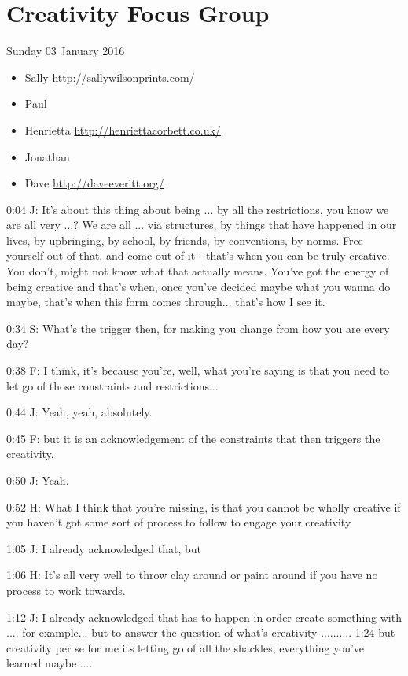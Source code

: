 \section{Creativity Focus Group}

Sunday 03 January 2016

\begin{itemize}
  \item Sally \url{http://sallywilsonprints.com/}
  \item Paul
  \item Henrietta \url{http://henriettacorbett.co.uk/}
  \item Jonathan
  \item Dave \url{http://daveeveritt.org/}
\end{itemize}


0:04 J: It's about this thing about being ... by all the restrictions, you know we are all very ...? We are all ... via structures, by things that have happened in our lives, by upbringing, by school, by friends, by conventions, by norms. Free yourself out of that, and come out of it - that's when you can be truly creative. You don't, might not know what that actually means. You've got the energy of being creative and that's when, once you've decided maybe what you wanna do maybe, that's when this form comes through... that's how I see it.

0:34 S: What's the trigger then, for making you change from how you are every day?

0:38 F: I think, it's because you're, well, what you're saying is that you need to let go of those constraints and restrictions...

0:44 J: Yeah, yeah, absolutely.

0:45 F: but it is an acknowledgement of the constraints that then triggers the creativity.

0:50 J: Yeah.

0:52 H: What I think that you're missing, is that you cannot be wholly creative if you haven't got some sort of process to follow to engage your creativity

1:05 J: I already acknowledged that, but

1:06 H: It's all very well to throw clay around or paint around if you have no process to work towards.

1:12 J: I already acknowledged that has to happen in order create something with .... for example... but to answer the question of what's creativity .......... 1:24 but creativity per se for me its letting go of all the shackles, everything you've learned maybe ....

